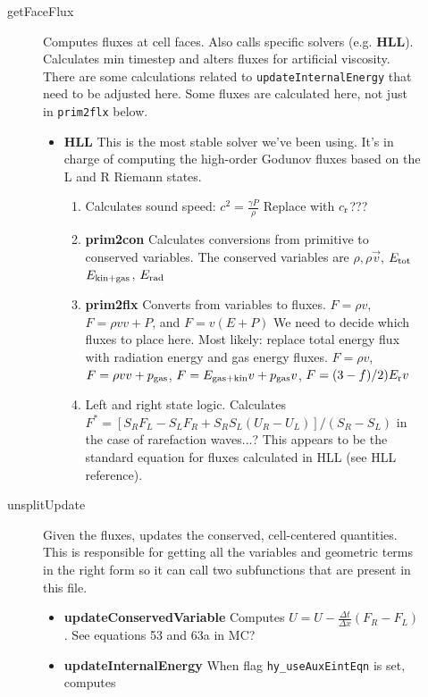 \documentclass[preprint,11pt]{aastex}
\begin{document}
\begin{description}
\begin{description}
\begin{itemize}
		\end{itemize}
		\item[getFaceFlux] Computes fluxes at cell faces.  Also calls specific solvers (e.g. \textbf{HLL}).  Calculates min timestep and alters fluxes for artificial viscosity. {\color{blue} There are some calculations related to \verb!updateInternalEnergy! that need to be adjusted here.  Some fluxes are calculated here, not just in \verb!prim2flx! below.}
		\begin{itemize}
			\item \textbf{HLL} This is the most stable solver we've been using.  It's in charge of computing the high-order Godunov fluxes based on the L and R Riemann states.
			\begin{enumerate}
				\item Calculates sound speed: {\color{red} $c^2 = \frac{\gamma P}{\rho}$} {\color{blue} Replace with $c_{\rm r}$???}
				\item \textbf{prim2con} Calculates conversions from primitive to conserved variables.  The conserved variables are $\rho, \rho \vec{v}$, {\color{red}$E_{\rm tot}$} {\color{blue}$E_{\rm kin+gas}$, $E_{\rm rad}$} \\
				\item \textbf{prim2flx} Converts from variables to fluxes.  {\color{red} $F = \rho v$, $F=\rho v v + P$, and $F= v(E + P)$} {\color{blue} We need to decide which fluxes to place here.  Most likely: replace total energy flux with radiation energy and gas energy fluxes.  $F=\rho v$, $F=\rho v v + p_{\rm gas}$, $F=E_{
			\rm gas + kin} v + p_{\rm gas} v$, $F=(3-f)/2)E_{\rm r} v$}
				\item Left and right state logic.  Calculates $F^* = \left[ S_R F_L - S_L F_R + S_R S_L (U_R - U_L) \right]/(S_R-S_L)$ in the case of rarefaction waves...?  This appears to be the standard equation for fluxes calculated in HLL (see HLL reference).
			\end{enumerate}
		\end{itemize}
		\item[unsplitUpdate] Given the fluxes, updates the conserved, cell-centered quantities.  This is responsible for getting all the variables and geometric terms in the right form so it can call two subfunctions that are present in this file.
		\begin{itemize}
			\item \textbf{updateConservedVariable} Computes $U = U-\frac{\Delta t}{\Delta x}\left( F_R - F_L \right)$.  See equations 53 and 63a in MC?
			\item \textbf{updateInternalEnergy} When flag \verb!hy_useAuxEintEqn! is set, computes 

\end{itemize}
\end{description}
\end{description}
\end{document}
